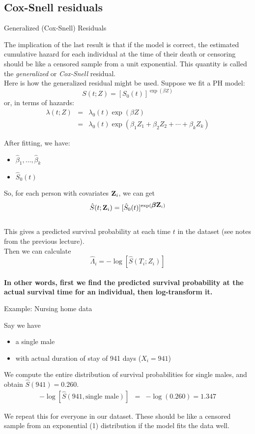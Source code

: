 \documentclass[envcountsect, 10pt, portrait, palatino]{beamer}
\newcommand{\bfbeta}{{\mbox{\boldmath$\beta$}}}
\newcommand{\bfZ}{{\mbox{{\bf Z}}}}
\begin{document}
\subsection{Cox-Snell residuals}
\begin{frame}{Generalized (Cox-Snell) Residuals}

The implication of the last result is that if the model is correct, the
estimated cumulative hazard for each individual at the time of
their death or censoring should be like a censored sample from
a unit exponential.  This quantity is called the {\em generalized}
or {\em Cox-Snell} residual.
\\[2ex]
Here is how the generalized residual might be used. Suppose we fit a PH
model:
\[S(t;Z)=[S_0(t)]^{\exp(\beta Z)}\]
or, in terms of hazards:
\begin{eqnarray*}
\lambda(t;Z) & = &\lambda_0(t)\exp(\beta Z)\\
& = & \lambda_0(t)\exp(\beta_1 Z_1+\beta_2 Z_2+ \cdots + \beta_k Z_k)
\end{eqnarray*}

After fitting, we have:
\begin{itemize}
\item $\hat{\beta}_1,\ldots,\hat{\beta}_k$
\item $\hat{S}_0(t)$
\end{itemize}
\end{frame}
\begin{frame}
So, for each person with covariates ${\bfZ_i}$, we can get
\[\hat{S}(t;{\bfZ_i})=[\hat{S}_0(t)]^{\exp(\bfbeta \bfZ_i)}\]
\\[2ex]
This gives a predicted survival probability at each time $t$
in the dataset (see notes from the previous lecture).
\\[2ex]
Then we can calculate
\[\hat{\Lambda}_i=-\log[\hat{S}(T_i;Z_i)]\]
\\[2ex]
{\bf In other words, first we find the predicted survival probability
at the actual survival time for an individual, then log-transform
it.}
\end{frame}
\begin{frame}{Example:  Nursing home data}

Say we have
\begin{itemize}
\item a single male
\item with actual duration of stay of 941 days ($X_i=941$)
\end{itemize}

We compute the entire distribution of survival probabilities
for single males, and obtain $\hat{S}(941)=0.260$.
\begin{eqnarray*}
-\log[\hat{S}(941,\mbox{single male})] & = & - \log(0.260) = 1.347
\end{eqnarray*}

We repeat this for everyone in our dataset.  These should be like a
censored sample from an exponential (1) distribution if
the model fits the data well.
\end{frame}
\end{document}
